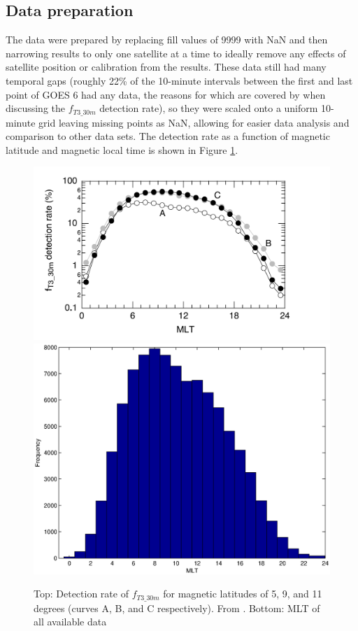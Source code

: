 \subsection{Data preparation}
The data were prepared by replacing fill values of 9999 with NaN and then narrowing results to only one satellite at a time to ideally remove any effects of satellite position or calibration from the results. These data still had many temporal gaps (roughly 22\% of the 10-minute intervals between the first and last point of GOES 6 had any data, the reasons for which are covered by \cite{Takahashi2010SolarCycleVariation} when discussing the $f_{T3\_30m}$ detection rate), so they were scaled onto a uniform 10-minute grid leaving missing points as NaN, allowing for easier data analysis and comparison to other data sets. The detection rate as a function of magnetic latitude and magnetic local time is shown in Figure \ref{fig:Takahashi2010Availability}.

\begin{figure}[htp!]
	\centering
	\includegraphics[width=0.8\linewidth]{Figures/Takahashi2010Availability.png}
	\includegraphics[width=0.8\linewidth]{Figures/databyMLT}
	\caption{Top: Detection rate of $f_{T3\_30m}$ for magnetic latitudes of 5, 9, and 11 degrees (curves A, B, and C respectively). From \citep{Takahashi2010SolarCycleVariation}. Bottom: MLT of all available data}
	\label{fig:Takahashi2010Availability}
\end{figure}


